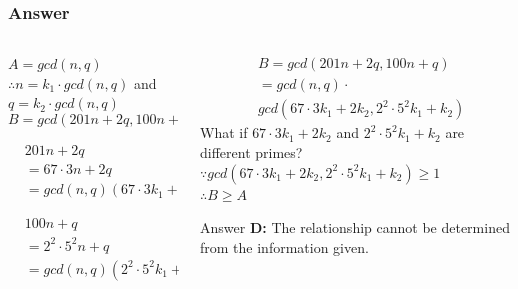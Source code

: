 \documentclass[
	11pt, %
	handout,
]{beamer}
\begin{document}
\begin{frame}
	\frametitle{Answer}



  	\begin{columns}[t] %
		\begin{column}{0.5\textwidth} %
			$A = gcd(n, q)$ \\
	$\therefore n = k_1 \cdot gcd(n, q)$ and $q = k_2 \cdot gcd(n, q)$\\
	\bigskip
	\begin{equation*}
		B = gcd(201n + 2q, 100n + q) 
	\end{equation*}
  
				
				\begin{equation*}
				  	\begin{aligned}
				  	&201n + 2q \\&= 67 \cdot 3 n + 2q \\&= gcd(n, q) ( 67 \cdot 3 k_1 + 2k_2)
				  	\end{aligned}
				  \end{equation*}

				  					\begin{equation*}
			  	\begin{aligned}
			  	&100n + q \\&= 2^2\cdot5^2n + q \\&= gcd(n, q) ( 2^2\cdot5^2k_1 + k_2)
			  	\end{aligned}
			  \end{equation*}

		\end{column}
		\begin{column}{0.5\textwidth} %
\begin{equation*}
			  	\begin{aligned}
			  	&B = gcd(201n + 2q, 100n + q)\\&=gcd(n,q) \cdot \\ &gcd(67 \cdot 3 k_1 + 2k_2, 2^2\cdot5^2k_1 + k_2)
			  	\end{aligned}
			  \end{equation*}
\pause				
\alert{What if $67 \cdot 3 k_1 + 2k_2$ and $2^2\cdot5^2k_1 + k_2$ are different primes?}\\

	$\because gcd(67 \cdot 3 k_1 + 2k_2, 2^2\cdot5^2k_1 + k_2) \geq 1$  \\ 
	$\therefore  B \geq A $ \\
		\bigskip

\pause
Answer \textbf{D: } The relationship cannot be determined from the information given.
		\end{column}
	\end{columns}
  
	



\end{frame}
\end{document}
